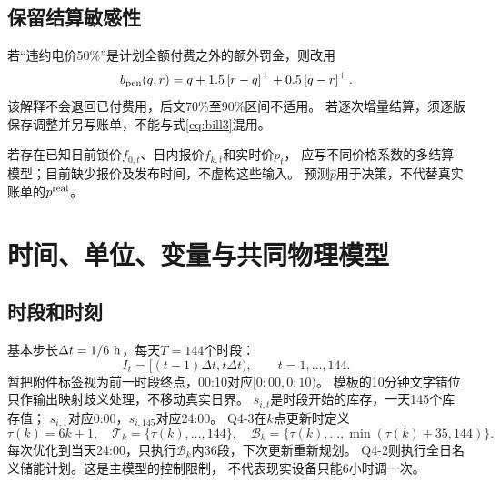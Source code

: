 \documentclass[UTF8,11pt]{ctexart}
\newcommand{\pos}[1]{\left[#1\right]^+}
\begin{document}
\subsection{保留结算敏感性}
若“违约电价50\%”是计划全额付费之外的额外罚金，则改用
\begin{equation}
 b_{\rm pen}(q,r)=q+1.5\pos{r-q}+0.5\pos{q-r}.
\end{equation}
该解释不会退回已付费用，后文70\%至90\%区间不适用。
若逐次增量结算，须逐版保存调整并另写账单，不能与式\eqref{eq:bill3}混用。

若存在已知日前锁价$f_{0,t}$、日内报价$f_{k,t}$和实时价$p_t$，
应写不同价格系数的多结算模型；目前缺少报价及发布时间，不虚构这些输入。
预测$\widehat p$用于决策，不代替真实账单的$p^{\rm real}$。

\section{时间、单位、变量与共同物理模型}
\subsection{时段和时刻}
基本步长$\Delta t=1/6\ {\rm h}$，每天$T=144$个时段：
\begin{equation}
 I_t=[(t-1)\Delta t,t\Delta t),\qquad t=1,\ldots,144.
\end{equation}
暂把附件标签视为前一时段终点，00:10对应$[0{:}00,0{:}10)$。
模板的10分钟文字错位只作输出映射歧义处理，不移动真实日界。
$s_{i,t}$是时段开始的库存，一天145个库存值；
$s_{i,1}$对应0:00，$s_{i,145}$对应24:00。
Q4-3在$k$点更新时定义
\begin{equation}
 \tau(k)=6k+1,\quad
 \mathcal T_k=\{\tau(k),\ldots,144\},\quad
 \mathcal B_k=\{\tau(k),\ldots,\min(\tau(k)+35,144)\}.
\end{equation}
每次优化到当天24:00，只执行$\mathcal B_k$内36段，下次更新重新规划。
Q4-2则执行全日名义储能计划。这是主模型的控制限制，
不代表现实设备只能6小时调一次。
\end{document}
